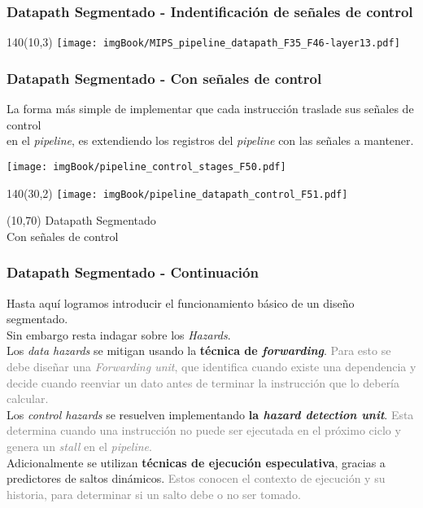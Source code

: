 \documentclass[aspectratio=169]{beamer}
\begin{document}
\begin{frame}[t,fragile]
    \frametitle{Datapath Segmentado - Indentificación de señales de control}
    \begin{textblock}{140}(10,3) \texttt{[image: imgBook/MIPS\_pipeline\_datapath\_F35\_F46-layer13.pdf]} \end{textblock}
\end{frame}

\begin{frame}[t,fragile]
\frametitle{Datapath Segmentado - Con señales de control}
    La forma más simple de implementar que cada instrucción traslade sus señales de control\\
    en el \emph{pipeline}, es \textcolor{naranjauca}{extendiendo los registros del \emph{pipeline} con las señales a mantener.}
    \begin{center}
    \texttt{[image: imgBook/pipeline\_control\_stages\_F50.pdf]}
    \end{center}
\end{frame}

\begin{frame}[t,fragile]
    \begin{textblock}{140}(30,2) \texttt{[image: imgBook/pipeline\_datapath\_control\_F51.pdf]} \end{textblock}
    \begin{textblock}{50}(10,70)
    {\Large \textcolor{naranjauca}{Datapath Segmentado\\ Con señales de control}}
    \end{textblock}
\end{frame}

\begin{frame}[t,fragile]
\frametitle{Datapath Segmentado - Continuación}
    Hasta aquí logramos introducir el funcionamiento básico de un diseño segmentado.\\
    \textcolor{naranjauca}{Sin embargo resta indagar sobre los \emph{Hazards}.\\}
    \bigskip
    \pause
    Los \emph{data hazards} se mitigan usando la \textbf{técnica de \emph{forwarding}}.
    \textcolor{gray}{Para esto se debe diseñar una \emph{Forwarding unit}, que identifica cuando existe una dependencia y decide cuando reenviar un dato antes de terminar la instrucción que lo debería calcular.\\}
    \bigskip
    \pause
    Los \emph{control hazards} se resuelven implementando \textbf{la \emph{hazard detection unit}}.
    \textcolor{gray}{Esta determina cuando una instrucción no puede ser ejecutada en el próximo ciclo y genera un \emph{stall} en el \emph{pipeline}.\\}
    \bigskip
    \pause
    Adicionalmente se utilizan \textbf{técnicas de ejecución especulativa}, gracias a predictores de saltos dinámicos.
    \textcolor{gray}{Estos conocen el contexto de ejecución y su historia, para determinar si un salto debe o no ser tomado.\\}
\end{frame}
\end{document}
